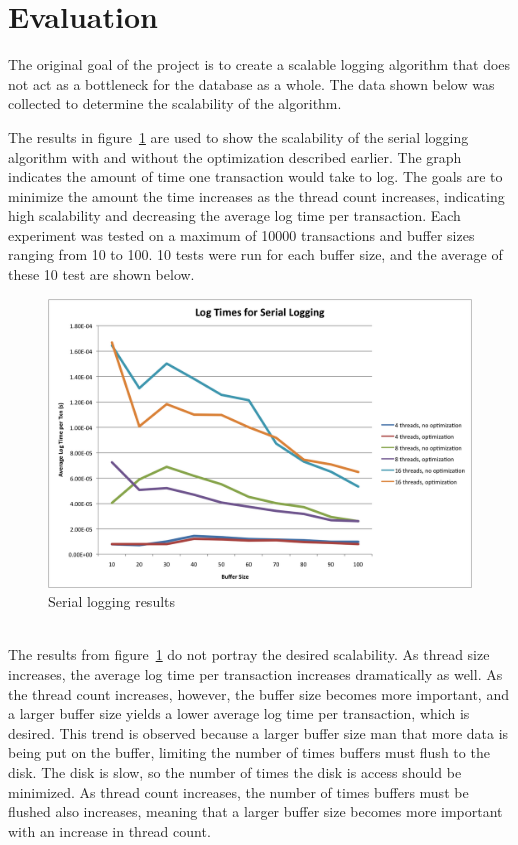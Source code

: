 \section{Evaluation}


The original goal of the project is to create a scalable logging algorithm that does not act as a bottleneck for the database as a whole. The data shown below was collected to determine the scalability of the algorithm. \par

The results in figure~\ref{serialresults} are used to show the scalability of the serial logging algorithm with and without the  optimization described earlier.  The graph indicates the amount of time one transaction would take to log. The goals are to minimize the amount the time increases as the thread count increases, indicating high scalability and decreasing the average log time per transaction. Each experiment  was tested on a maximum of 10000 transactions and buffer sizes ranging from 10 to 100. 10 tests were run for each buffer size, and the average of these 10 test are shown below. \par 

\begin{figure}[!h]
  \includegraphics[width=\textwidth]{results.png}
  \caption{Serial logging results}
  \label{serialresults}
\end{figure}\\

The results from figure~\ref{serialresults} do not portray the desired scalability. As thread size increases, the average log time per transaction increases dramatically as well. As the thread count increases, however, the buffer size becomes more important, and a larger buffer size yields a lower average log time per transaction, which is desired. This trend is observed because a larger buffer size man that more data is being put on the buffer, limiting the number of times buffers must flush to the disk. The disk is slow, so the number of times the disk is access should be minimized. As thread count increases, the number of times buffers must be flushed also increases, meaning that a larger buffer size becomes more important with an increase in thread count. \par

